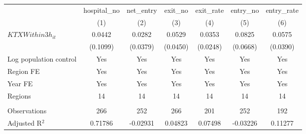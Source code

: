 \begingroup
\centering
\begin{tabular}{lcccccc}
   \toprule
                          & hospital\_no  & net\_entry  & exit\_no  & exit\_rate  & entry\_no  & entry\_rate \\    
                          & (1)           & (2)         & (3)       & (4)         & (5)        & (6)\\  
   \midrule 
   $KTXWithin3h_{it}$     & 0.0442        & 0.0282      & 0.0529    & 0.0353      & 0.0825     & 0.0575\\   
                          & (0.1099)      & (0.0379)    & (0.0450)  & (0.0248)    & (0.0668)   & (0.0390)\\   
   Log population control & Yes           & Yes         & Yes       & Yes         & Yes        & Yes\\  
   Region FE              & Yes           & Yes         & Yes       & Yes         & Yes        & Yes\\  
   Year FE                & Yes           & Yes         & Yes       & Yes         & Yes        & Yes\\  
   Regions                & 14            & 14          & 14        & 14          & 14         & 14\\  
    \\
   Observations           & 266           & 252         & 266       & 201         & 252        & 192\\  
   Adjusted R$^2$         & 0.71786       & -0.02931    & 0.04823   & 0.07498     & -0.03226   & 0.11277\\  
   \bottomrule
\end{tabular}
\par\endgroup
